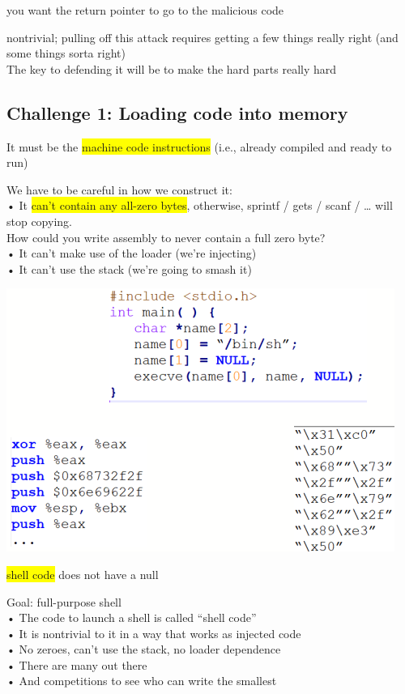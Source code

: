 \documentclass[]{project_plan}
\begin{document}
you want the return pointer to go to the malicious code

nontrivial; pulling off this attack requires getting a few things really right
(and some things sorta right)\\
The key to defending it will be to make the hard parts really hard

\subsection{Challenge 1: Loading code into memory}

It must be the \colorbox{yellow}{machine code instructions} (i.e., already compiled and ready to run)

We have to be careful in how we construct it:\\
• It \colorbox{yellow}{can’t contain any all-zero bytes}, otherwise, sprintf / gets / scanf / … will stop copying.\\

How could you write assembly to never contain a full zero byte?\\
• It can’t make use of the loader (we’re injecting)\\
• It can’t use the stack (we’re going to smash it)

\includegraphics[width=.6\linewidth]{lec6 loading code into memory.png}

\colorbox{yellow}{shell code} does not have a null

Goal: full-purpose shell\\
• The code to launch a shell is called “shell code”\\
• It is nontrivial to it in a way that works as injected code\\
• No zeroes, can’t use the stack, no loader dependence\\
• There are many out there\\
• And competitions to see who can write the smallest
\end{document}
